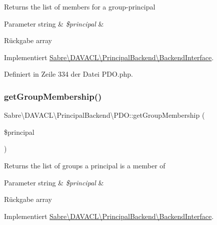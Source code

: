 Returns the list of members for a group-\/principal


\begin{DoxyParams}[1]{Parameter}
string & {\em \$principal} & \\
\hline
\end{DoxyParams}
\begin{DoxyReturn}{Rückgabe}
array 
\end{DoxyReturn}


Implementiert \mbox{\hyperlink{interface_sabre_1_1_d_a_v_a_c_l_1_1_principal_backend_1_1_backend_interface_adb97d3bf0d019cf48391a0bc1425e0ce}{Sabre\textbackslash{}\+D\+A\+V\+A\+C\+L\textbackslash{}\+Principal\+Backend\textbackslash{}\+Backend\+Interface}}.



Definiert in Zeile 334 der Datei P\+D\+O.\+php.

\mbox{\label{class_sabre_1_1_d_a_v_a_c_l_1_1_principal_backend_1_1_p_d_o_af19a397542ae2ed37d9108fb887139e6}} 
\subsubsection{\texorpdfstring{get\+Group\+Membership()}{getGroupMembership()}}
{\footnotesize\ttfamily Sabre\textbackslash{}\+D\+A\+V\+A\+C\+L\textbackslash{}\+Principal\+Backend\textbackslash{}\+P\+D\+O\+::get\+Group\+Membership (\begin{DoxyParamCaption}\item[{}]{\$principal }\end{DoxyParamCaption})}

Returns the list of groups a principal is a member of


\begin{DoxyParams}[1]{Parameter}
string & {\em \$principal} & \\
\hline
\end{DoxyParams}
\begin{DoxyReturn}{Rückgabe}
array 
\end{DoxyReturn}


Implementiert \mbox{\hyperlink{interface_sabre_1_1_d_a_v_a_c_l_1_1_principal_backend_1_1_backend_interface_ac57affc7cfeb292c4262bd555953c372}{Sabre\textbackslash{}\+D\+A\+V\+A\+C\+L\textbackslash{}\+Principal\+Backend\textbackslash{}\+Backend\+Interface}}.



